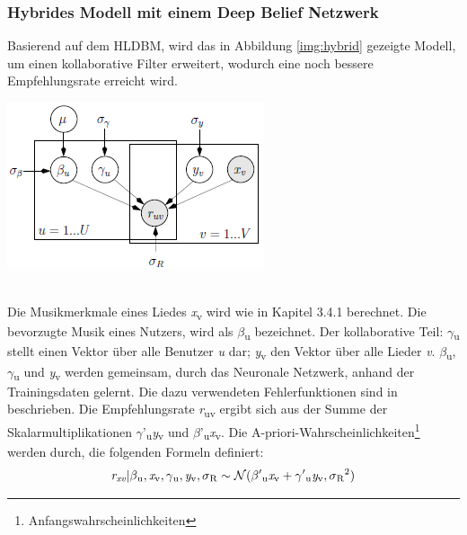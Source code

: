 \documentclass[twosided,a4,10pt]{article}
\begin{document}
\begin{multicols}{2}
		\subsubsection{Hybrides Modell mit einem Deep Belief Netzwerk}
		Basierend auf dem HLDBM, wird das in Abbildung \ref{img:hybrid} gezeigte Modell, um einen kollaborative Filter erweitert, wodurch eine noch bessere Empfehlungsrate erreicht wird.
		\begin{minipage}{0.45\textwidth}
			\centering
			\includegraphics{img/hybrid.png}
			\label{img:hybrid}
		\end{minipage}\newline\\
		Die Musikmerkmale eines Liedes \textit{x}\textsubscript{v} wird wie in Kapitel 3.4.1 berechnet. Die bevorzugte Musik eines Nutzers, wird als $\beta$\textsubscript{u} bezeichnet. Der kollaborative Teil: $\gamma$\textsubscript{u} stellt einen Vektor über alle Benutzer \textit{u} dar; \textit{y}\textsubscript{v} den Vektor über alle Lieder \textit{v}. $\beta$\textsubscript{u}, $\gamma$\textsubscript{u} und \textit{y}\textsubscript{v} werden gemeinsam, durch das Neuronale Netzwerk, anhand der Trainingsdaten gelernt. Die dazu verwendeten Fehlerfunktionen sind in \cite{wang} beschrieben. Die Empfehlungsrate \textit{r}\textsubscript{uv} ergibt sich aus der Summe der Skalarmultiplikationen  $\gamma$'\textsubscript{u}\textit{y}\textsubscript{v} und  $\beta$'\textsubscript{u}\textit{x}\textsubscript{v}. Die A-priori-Wahrscheinlichkeiten\footnote[19]{Anfangswahrscheinlichkeiten} werden durch, die folgenden Formeln definiert:\newline
		\begin{equation*}
		\centering
		\textit{r\textsubscript{xv}}|\beta\textsubscript{u},\textit{x}\textsubscript{v},\gamma\textsubscript{u},\textit{y}\textsubscript{v},\sigma\textsubscript{R}\sim\mathcal{N}(\beta'\textsubscript{u}\textit{x}\textsubscript{v} + \gamma'\textsubscript{u}\textit{y}\textsubscript{v},\sigma\textsubscript{R}\textsuperscript{2})

\end{equation*}
\end{multicols}
\end{document}
